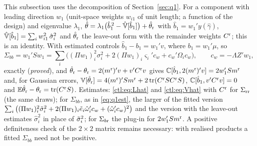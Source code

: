 This subsection uses the decomposition of Section~\ref{sec:q1}. For a component with leading direction $w_1$
(unit-space weights $w_{i1}$ of unit length; a function of the design) and eigenvalue $\lambda_1$,
$\hat\theta=\lambda_1\big(\hat b_1^{\,2}-\hat{\mathbb{V}}[\hat b_1]\big)+\hat\theta_{\rm r}$ with $\hat b_1=w_1'y(\hat\gamma)$,
$\hat{\mathbb{V}}[\hat b_1]=\sum_iw_{i1}^2\,\hat\sigma_i^2$ and $\hat\theta_{\rm r}$ the leave-out form with the remainder
weights $C^{\rm r}$; this is an identity. With estimated controls $\hat b_1-b_1=w_1'v$, where $b_1=w_1'\mu$, so
\[
 \Sigma_{bb}=w_1'Sw_1=\sum_i\bigl((\Pi w_1)_i^2\sigma_i^2+2(\Pi w_1)_i\varsigma_i'c_w+c_w'\Omega_ic_w\bigr),\qquad
 c_w=-\Lambda Z'w_1,
\]
exactly (\emph{proved}), and $\hat\theta_{\rm r}-\theta_{\rm r}=2(m^{\rm r})'v+v'C^{\rm r}v$ gives
$\mathbb{C}[\hat b_1,2(m^{\rm r})'v]=2w_1'Sm^{\rm r}$ and, for Gaussian errors,
$\mathbb{V}[\hat\theta_{\rm r}]=4(m^{\rm r})'Sm^{\rm r}+2\operatorname{tr}(C^{\rm r}SC^{\rm r}S)$, $\mathbb{C}[\hat b_1,v'C^{\rm r}v]=0$ and
$\mathbb{E}\hat\theta_{\rm r}-\theta_{\rm r}=\operatorname{tr}(C^{\rm r}S)$. Estimates: \eqref{ctl:eq:Lhat} and \eqref{ctl:eq:Vhat} with
$C^{\rm r}$ for $\Sigma_{\rm rr}$ (the same draws); for $\Sigma_{bb}$, as in \eqref{eq:q1est}, the larger of the fitted
version $\sum_i\big((\Pi w_1)_i^2\tilde\sigma_i^2+2(\Pi w_1)_i\tilde e_i\hat\omega_i'c_w+(\hat\omega_i'c_w)^2\big)$ and the version
with the leave-out estimates $\hat\sigma_i^2$ in place of $\tilde\sigma_i^2$; for $\Sigma_{b{\rm r}}$ the plug-in for
$2w_1'Sm^{\rm r}$. A positive definiteness check of the $2\times2$ matrix remains necessary: with realised products a
fitted $\Sigma_{bb}$ need not be positive.

